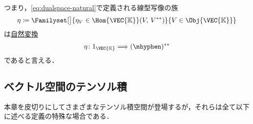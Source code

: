 \documentclass[geometry_main]{subfiles}
\begin{document}
つまり，\eqref{eq:dualspace-natural}で定義される線型写像の族
\begin{align}
	\eta \coloneqq \Familyset[\big]{\eta_V \in \Hom{\VEC{\mathbb{K}}}(V,\, V^{**})}{V \in \Obj{\VEC{\mathbb{K}}}}
\end{align}
は\hyperref[def:natural]{自然変換}
\begin{align}
	\eta \colon 1_{\VEC{\mathbb{K}}} \Longrightarrow (\mhyphen)^{**}
\end{align}
であると言える．








\subsection{ベクトル空間のテンソル積}

本章を皮切りにしてさまざまなテンソル積空間が登場するが，それらは全て以下に述べる定義の特殊な場合である．
\end{document}
